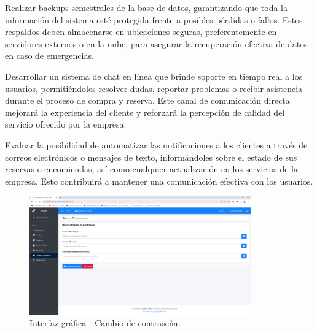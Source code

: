 Realizar backups semestrales de la base de datos, garantizando que toda la información del sistema esté protegida frente a posibles pérdidas o fallos. Estos respaldos deben almacenarse en ubicaciones seguras, preferentemente en servidores externos o en la nube, para asegurar la recuperación efectiva de datos en caso de emergencias.

Desarrollar un sistema de chat en línea que brinde soporte en tiempo real a los usuarios, permitiéndoles resolver dudas, reportar problemas o recibir asistencia durante el proceso de compra y reserva. Este canal de comunicación directa mejorará la experiencia del cliente y reforzará la percepción de calidad del servicio ofrecido por la empresa.

Evaluar la posibilidad de automatizar las notificaciones a los clientes a través de correos electrónicos o mensajes de texto, informándoles sobre el estado de sus reservas o encomiendas, así como cualquier actualización en los servicios de la empresa. Esto contribuirá a mantener una comunicación efectiva con los usuarios.

\begin{figure}[!h] %
	\caption[Interfaz gráfica - Cambio de contraseña]
	{\newline Interfaz gráfica - Cambio de contraseña.} %
	\centering
	\includegraphics[width=0.85\textwidth]{imagenes/cap_3/Img_calibus/CALIBUS09.png} %
	
	\begin{flushleft}
	\end{flushleft}
	\vspace{-16pt}
	\label{fig:cali40} %
\end{figure}

